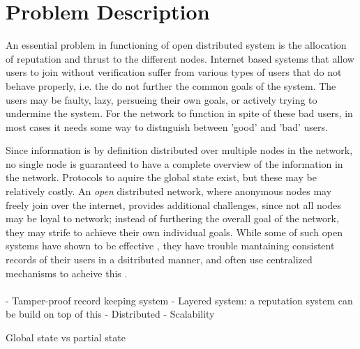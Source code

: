 \chapter{Problem Description}
An essential problem in functioning of open distributed system is the allocation of reputation and thrust to the different nodes. Internet based systems that allow users to join without verification suffer from various types of users that do not behave properly, i.e. the do not further the common goals of the system. The users may be faulty, lazy, persueing their own goals, or actively trying to undermine the system. For the network to function in spite of these bad users, in most cases it needs some way to distnguish between 'good' and 'bad' users. 

 Since information is by definition distributed over multiple nodes in the network, no single node is guaranteed to have a complete overview of the information in the network. Protocols to aquire the global state exist, but these may be relatively costly\cite{}. An \emph{open} distributed network, where anonymous nodes may freely join over the internet, provides additional challenges, since not all nodes may be loyal to network; instead of furthering the overall goal of the network, they may strife to achieve their own individual goals. While some of such open systems have shown to be effective \cite{}, they have trouble mantaining consistent records of their users \cite{} in a dsitributed manner, and often use centralized mechanisms to acheive this \cite{}.\\
\\



	- Tamper-proof record keeping system
	- Layered system: a reputation system can be build on top of this
	- Distributed	
	- Scalability


{Global state vs partial state}

